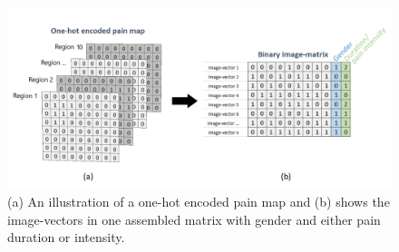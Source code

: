 \begin{figure} [H]
\centering
\includegraphics[width=1\textwidth]{figures/onehotmatrix}
\caption{(a) An illustration of a one-hot encoded pain map and (b) shows the image-vectors in one assembled matrix with gender and either pain duration or intensity.}
\label{fig:onehot}
\end{figure}
